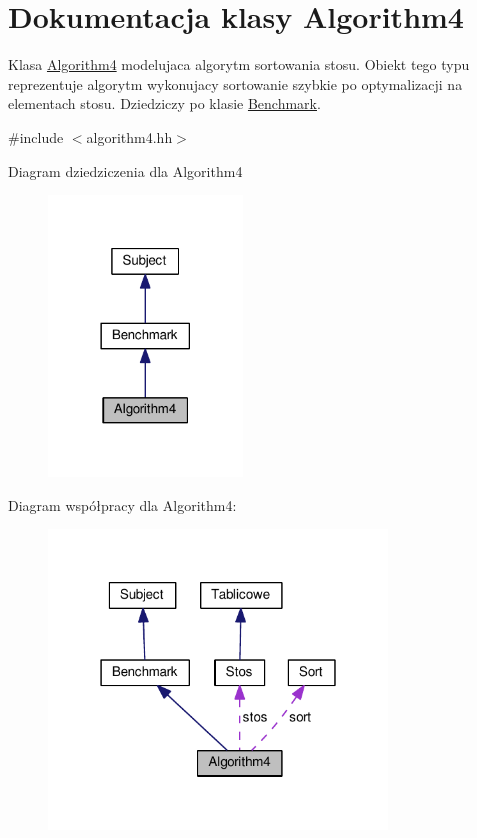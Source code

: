 \hypertarget{class_algorithm4}{\section{Dokumentacja klasy Algorithm4}
\label{class_algorithm4}
}


Klasa \hyperlink{class_algorithm4}{Algorithm4} modelujaca algorytm sortowania stosu. Obiekt tego typu reprezentuje algorytm wykonujacy sortowanie szybkie po optymalizacji na elementach stosu. Dziedziczy po klasie \hyperlink{class_benchmark}{Benchmark}.  




{\ttfamily \#include $<$algorithm4.\-hh$>$}



Diagram dziedziczenia dla Algorithm4\nopagebreak
\begin{figure}[H]
\begin{center}
\leavevmode
\includegraphics[width=146pt]{class_algorithm4__inherit__graph}
\end{center}
\end{figure}


Diagram współpracy dla Algorithm4\-:\nopagebreak
\begin{figure}[H]
\begin{center}
\leavevmode
\includegraphics[width=255pt]{class_algorithm4__coll__graph}
\end{center}
\end{figure}
